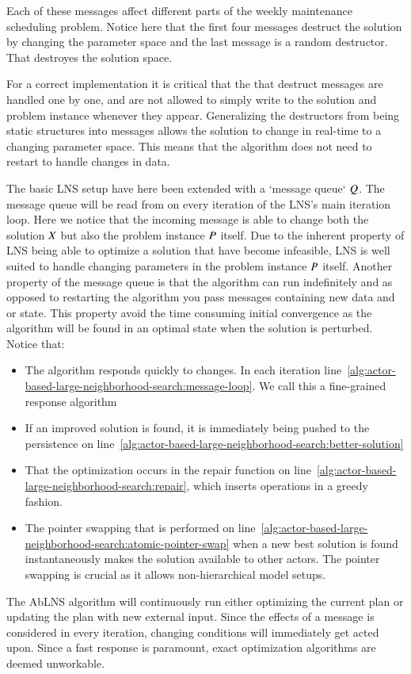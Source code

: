Each of these messages affect different parts of the weekly maintenance scheduling 
problem. Notice here that the first four messages destruct the solution by
changing the parameter space and the last message is a random destructor. That destroyes
the solution space.

For a correct implementation it is critical that the that destruct messages are 
handled one by one, and are not allowed to simply write to the solution and
problem instance whenever they appear.
Generalizing the destructors from being static structures into messages allows
the solution to change in real-time to a changing parameter space. This means
that the algorithm does not need to restart to handle changes in data.




The basic LNS setup have here been extended with a `message queue` $Q$. The message
queue will be read from on every iteration of the LNS's main iteration loop.
Here we notice that the incoming message is able to change both the solution $X$
but also the problem instance $P$ itself. Due to the inherent property of LNS being
able to optimize a solution that have become infeasible, LNS is well suited to handle changing parameters 
in the problem instance $P$ itself. Another property of the message queue is 
that the algorithm can run indefinitely and as opposed to restarting the algorithm you
pass messages containing new data and or state. This property avoid the time consuming initial
convergence as the algorithm will be found in an optimal state when the
solution is perturbed. Notice that:

\begin{itemize}
    \item The algorithm responds quickly to changes. In each iteration line~\ref{alg:actor-based-large-neighborhood-search:message-loop}. We call this a fine-grained response algorithm
    \item If an improved solution is found, it is immediately being pushed to the persistence on line~\ref{alg:actor-based-large-neighborhood-search:better-solution}
    \item That the optimization occurs in the repair function on line~\ref{alg:actor-based-large-neighborhood-search:repair}, which inserts operations in a greedy fashion. 
	\item The pointer swapping that is performed on line~\ref{alg:actor-based-large-neighborhood-search:atomic-pointer-swap} when a new best solution is found instantaneously makes the solution available to other actors. The pointer swapping is crucial as it allows non-hierarchical model setups. 
\end{itemize}

The AbLNS algorithm will continuously run either optimizing the current plan or updating the plan 
with new external input. Since the effects of a message is considered in every iteration, changing 
conditions will immediately get acted upon. Since a fast response is paramount, exact optimization algorithms are deemed unworkable.
